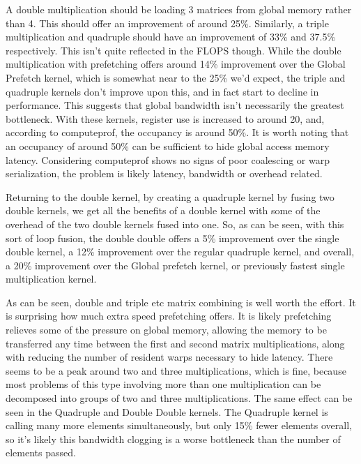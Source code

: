 \documentclass[a4paper,12pt]{report}
\def\flops{{FLOPS}}
\begin{document}
A double multiplication should be loading 3 matrices from global memory rather than 4.
This should offer an improvement of around 25\%.
Similarly, a triple multiplication and quadruple should have an improvement of 33\% and 37.5\% respectively.
This isn't quite reflected in the \flops{} though.
While the double multiplication with prefetching offers around 14\%
improvement over the Global Prefetch kernel, which is somewhat near to the 25\%
we'd expect, the triple and quadruple kernels don't improve upon this, and in fact start to decline in performance.
This suggests that global bandwidth isn't necessarily the greatest bottleneck.
With these kernels, register use is increased to around 20, and, according to computeprof, the occupancy is around 50\%.
It is worth noting that an occupancy of around 50\% can be sufficient to hide global access memory latency.
Considering computeprof shows no signs of poor coalescing or warp serialization, the problem is likely latency, bandwidth or overhead related.

Returning to the double kernel, by creating a quadruple kernel by fusing two double kernels, we get all the benefits of a double kernel with some of the overhead of the two double kernels fused into one.
So, as can be seen, with this sort of loop fusion, the double double offers a 5\%
improvement over the single double kernel, a 12\%
improvement over the regular quadruple kernel, and overall, a 20\%
improvement over the Global prefetch kernel, or previously fastest single multiplication kernel.

As can be seen, double and triple etc matrix combining is well worth the effort.
It is surprising how much extra speed prefetching offers.
It is likely prefetching relieves some of the pressure on global memory, allowing the memory to be transferred any time between the first and second matrix multiplications, along with reducing the number of resident warps necessary to hide latency.
There seems to be a peak around two and three multiplications, which is fine, because most problems of this type involving more than one multiplication can be decomposed into groups of two and three multiplications.
The same effect can be seen in the Quadruple and Double Double kernels.
The Quadruple kernel is calling many more elements simultaneously, but only 15\% fewer elements overall, so it's likely this bandwidth clogging is a worse bottleneck than the number of elements passed.
\end{document}
